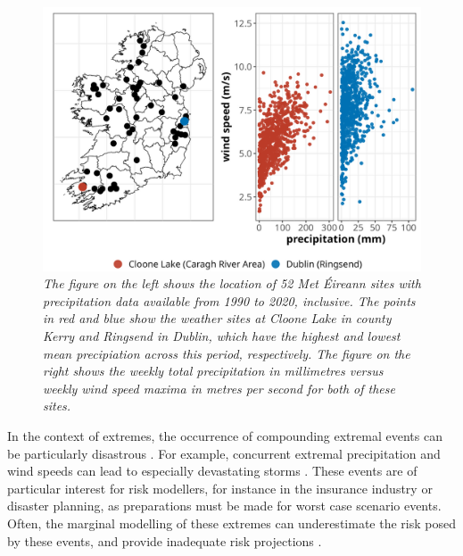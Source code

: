 \documentclass{article}
\numberwithin{equation}{section}
\begin{document}
\begin{figure}[H]
    \centering
    \includegraphics[width = 0.9\linewidth]{plots/02_mot_ex_plot_crop.png}
    \caption{\emph{The figure on the left shows the location of 52 Met Éireann sites with precipitation data available from 1990 to 2020, inclusive. The points in red and blue show the weather sites at Cloone Lake in county Kerry and Ringsend in Dublin, which have the highest and lowest mean precipiation across this period, respectively. The figure on the right shows the weekly total precipitation in millimetres versus weekly wind speed maxima in metres per second for both of these sites.}}
    \label{fig:02_locs}
\end{figure}

In the context of extremes, the occurrence of compounding extremal events can be particularly disastrous \citep{Vignotto2021, Leonard2014}.
For example, concurrent extremal precipitation and wind speeds can lead to especially devastating storms \citep{Martius2016}.
These events are of particular interest for risk modellers, for instance in the insurance industry or disaster planning, as preparations must be made for worst case scenario events.
Often, the marginal modelling of these extremes can underestimate the risk posed by these events, and provide inadequate risk projections \citep{Zscheischler2017}.
\end{document}
